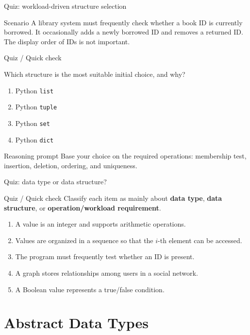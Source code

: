 \documentclass[aspectratio=169]{beamer}
\newcommand{\quizblock}[1]{%
  \begin{alertblock}{Quiz / Quick check}
    #1
  \end{alertblock}
}
\begin{document}
\begin{frame}{Quiz: workload-driven structure selection}
\footnotesize
\begin{block}{Scenario}
A library system must frequently check whether a book ID is currently borrowed.
It occasionally adds a newly borrowed ID and removes a returned ID.
The display order of IDs is not important.
\end{block}
\quizblock{
Which structure is the most suitable initial choice, and why?
\begin{enumerate}
  \item Python \texttt{list}
  \item Python \texttt{tuple}
  \item Python \texttt{set}
  \item Python \texttt{dict}
\end{enumerate}}
\vspace{0.25em}
\begin{alertblock}{Reasoning prompt}
Base your choice on the required operations: membership test, insertion,
deletion, ordering, and uniqueness.
\end{alertblock}
\end{frame}

\begin{frame}{Quiz: data type or data structure?}
\small
\quizblock{Classify each item as mainly about \textbf{data type}, \textbf{data structure}, or \textbf{operation/workload requirement}.}
\vspace{0.3em}
\begin{enumerate}
  \item A value is an integer and supports arithmetic operations.
  \item Values are organized in a sequence so that the $i$-th element can be accessed.
  \item The program must frequently test whether an ID is present.
  \item A graph stores relationships among users in a social network.
  \item A Boolean value represents a true/false condition.
\end{enumerate}
\end{frame}

\section{Abstract Data Types}
\end{document}
